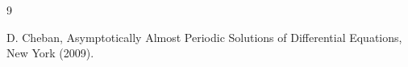 \documentclass[english,reqno]{amsart}
\numberwithin{equation}{section}
\theoremstyle{plain}
\theoremstyle{definition}
\theoremstyle{remark}
\begin{document}
%





\begin{thebibliography}{9}


















 D. Cheban, Asymptotically Almost Periodic Solutions of Differential Equations, New York (2009).









\end{thebibliography}
\end{document}
